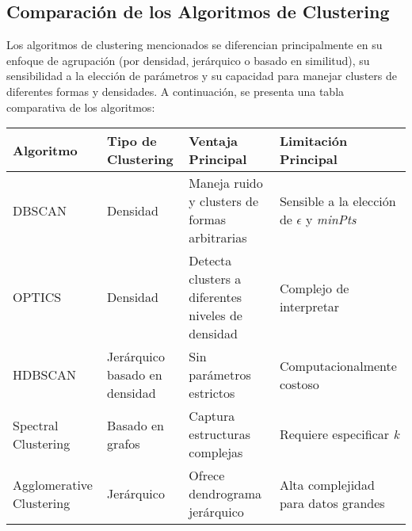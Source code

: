 \subsection*{Comparación de los Algoritmos de Clustering}

Los algoritmos de clustering mencionados se diferencian principalmente en su enfoque de agrupación (por densidad, jerárquico o basado en similitud), su sensibilidad a la elección de parámetros y su capacidad para manejar clusters de diferentes formas y densidades. A continuación, se presenta una tabla comparativa de los algoritmos:

\begin{table}[ht]
\centering
\begin{tabular}{|l|l|l|l|}
\hline
\textbf{Algoritmo} & \textbf{Tipo de Clustering} & \textbf{Ventaja Principal} & \textbf{Limitación Principal} \\
\hline
DBSCAN & Densidad & Maneja ruido y clusters de formas arbitrarias & Sensible a la elección de \(\epsilon\) y \textit{minPts} \\
OPTICS & Densidad & Detecta clusters a diferentes niveles de densidad & Complejo de interpretar \\
HDBSCAN & Jerárquico basado en densidad & Sin parámetros estrictos & Computacionalmente costoso \\
Spectral Clustering & Basado en grafos & Captura estructuras complejas & Requiere especificar \textit{k} \\
Agglomerative Clustering & Jerárquico & Ofrece dendrograma jerárquico & Alta complejidad para datos grandes \\
\hline
\end{tabular}
\end{table}

